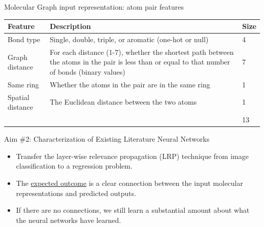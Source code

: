 \documentclass[compress]{beamer}
\newcommand\Fontsmaller{\fontsize{9pt}{10.0}\selectfont}
\begin{document}
\begin{frame}{Molecular Graph input representation: atom pair features}
  \begin{table}[htbp]
    \centering
    \begin{tabular}{@{}lp{}l@{}}
      \toprule
      Feature & Description & Size \\ \midrule
      Bond type & Single, double, triple, or aromatic (one-hot or null) & 4 \\
      Graph distance & For each distance (1-7), whether the shortest path between the atoms in the pair is less than or equal to that number of bonds (binary values) & 7 \\
      Same ring & Whether the atoms in the pair are in the same ring & 1 \\
      Spatial distance & The Euclidean distance between the two atoms & 1 \\ \midrule
      &  & 13 \\ \bottomrule
    \end{tabular}
  \end{table}
\end{frame}


\begin{frame}{Aim \#2: Characterization of Existing Literature Neural Networks}
  \begin{itemize}
  \item Transfer the layer-wise relevance propagation (LRP) technique from image classification to a regression problem.
  \item The \underline{expected outcome} is a clear connection between the input molecular representations and predicted outputs.
  \item If there are no connections, we still learn a substantial amount about what the neural networks have learned.
  \end{itemize}
\end{frame}

\end{document}
